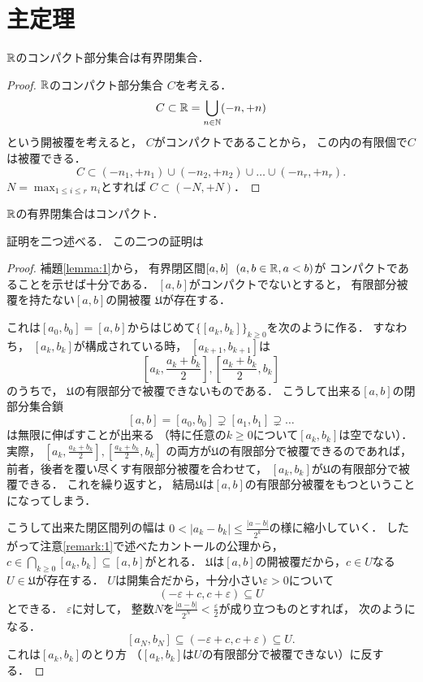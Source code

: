 \documentclass[]{jsarticle}
\newcommand{\U}{\mathfrak{U}}
\begin{document}
\section{主定理}
\begin{Thm}
    $\mathbb{R}$のコンパクト部分集合は有界閉集合．
\end{Thm}
\begin{proof}
    $\mathbb{R}$のコンパクト部分集合 $C$を考える．
    \[ C \subset \mathbb{R}=\bigcup_{n \in \mathbb{N}} (-n,+n) \]
    という開被覆を考えると，
    $C$がコンパクトであることから，
    この内の有限個で$C$は被覆できる．
    \[ C \subset (-n_1,+n_1) \cup (-n_2,+n_2) \cup \dots \cup (-n_r,+n_r). \]
    $N=\max_{1 \leq i \leq r} n_i$とすれば
    $C \subset (-N, +N)$．
\end{proof}

\begin{Thm}
    $\mathbb{R}$の有界閉集合はコンパクト．
\end{Thm}
証明を二つ述べる．
この二つの証明は
\begin{proof}
    補題\ref{lemma:1}から，
    有界閉区間$[a,b] ~~(a,b \in \mathbb{R}, a < b)$が
    コンパクトであることを示せば十分である．
    $[a,b]$がコンパクトでないとすると，
    有限部分被覆を持たない$[a,b]$の開被覆 $\U$が存在する．

    これは$[a_0,b_0]=[a,b]$からはじめて$\{[a_k, b_k]\}_{k \geq 0}$を次のように作る．
    すなわち，
    $[a_k,b_k]$が構成されている時，
    $[a_{k+1},b_{k+1}]$は
    \[
        \left[ a_k, \frac{a_k+b_k}{2} \right],
        \left[ \frac{a_k+b_k}{2}, b_k \right]
    \]
    のうちで，
    $\U$の有限部分で被覆できないものである．
    こうして出来る$[a,b]$の閉部分集合鎖
    \[ [a,b]=[a_0,b_0] \supsetneq [a_1,b_1] \supsetneq \dots \]
    は無限に伸ばすことが出来る
    （特に任意の$k \geq 0$について$[a_k,b_k]$は空でない）．
    実際，
    $\left[ a_k, \frac{a_k+b_k}{2} \right],\left[ \frac{a_k+b_k}{2}, b_k \right]$
    の両方が$\U$の有限部分で被覆できるのであれば，
    前者，後者を覆い尽くす有限部分被覆を合わせて，
    $[a_k,b_k]$が$\U$の有限部分で被覆できる．
    これを繰り返すと，
    結局$\U$は$[a,b]$の有限部分被覆をもつということになってしまう．

    こうして出来た閉区間列の幅は
    $0 < |a_k-b_k| \leq \frac{|a-b|}{2^k}$の様に縮小していく．
    したがって注意\ref{remark:1}で述べたカントールの公理から，
    $c \in \bigcap_{k \geq 0} [a_k,b_k] \subseteq [a,b]$がとれる．
    $\U$は$[a,b]$の開被覆だから，$c \in U$なる$U \in \U$が存在する．
    $U$は開集合だから，十分小さい$\varepsilon>0$について
    \[ (-\varepsilon+c, c+\varepsilon) \subseteq U \]
    とできる．
    $\varepsilon$に対して，
    整数$N$を$\frac{|a-b|}{2^N}<\frac{\varepsilon}{2}$が成り立つものとすれば，
    次のようになる．
    \[ [a_N, b_N] \subseteq (-\varepsilon+c, c+\varepsilon) \subseteq U. \]
    これは$[a_k, b_k]$のとり方
    （$[a_k, b_k]$は$U$の有限部分で被覆できない）に反する．
\end{proof}
\end{document}
